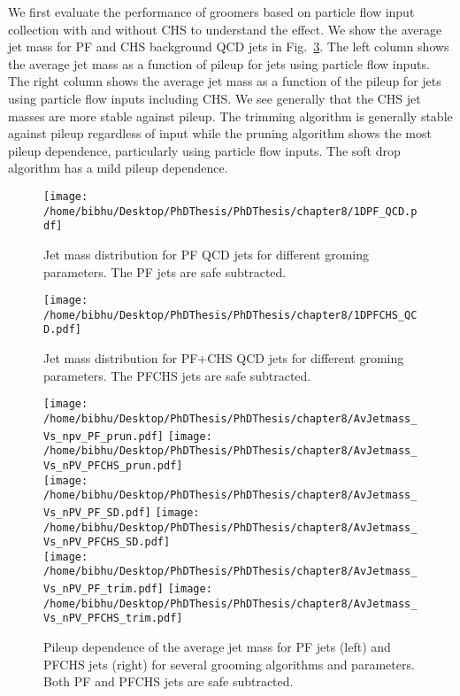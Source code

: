 We first evaluate the performance of groomers based on particle flow input collection with and without CHS to understand the effect.
We show the average jet mass for PF and CHS background QCD jets in Fig.~\ref{fig:grooming_PFvCHS}.
The left column shows the average jet mass as a function of pileup for jets using particle flow inputs.
The right column shows the average jet mass as a function of the pileup for jets using particle flow inputs including CHS.
We see generally that the CHS jet masses are more stable against pileup.  
The trimming algorithm is generally stable against pileup regardless of input while the pruning algorithm shows the most pileup dependence, particularly using particle flow inputs.
The soft drop algorithm has a mild pileup dependence.


\begin{figure}[h!]
\centering
\texttt{[image: /home/bibhu/Desktop/PhDThesis/PhDThesis/chapter8/1DPF\_QCD.pdf]}
\caption{Jet mass distribution for PF  QCD jets for different groming parameters. The PF jets are safe subtracted.}
\label{fig:jet_mass_pf_all_groomer}
\end{figure}


\begin{figure}[h!]
\centering
\texttt{[image: /home/bibhu/Desktop/PhDThesis/PhDThesis/chapter8/1DPFCHS\_QCD.pdf]}
\caption{Jet mass distribution for PF+CHS  QCD jets for different groming parameters. The PFCHS jets are safe subtracted.}
\label{fig:jet_mass_chs_all_groomer}
\end{figure}



\begin{figure}[h!]
\centering
\texttt{[image: /home/bibhu/Desktop/PhDThesis/PhDThesis/chapter8/AvJetmass\_Vs\_npv\_PF\_prun.pdf]}
\texttt{[image: /home/bibhu/Desktop/PhDThesis/PhDThesis/chapter8/AvJetmass\_Vs\_nPV\_PFCHS\_prun.pdf]}\\
\texttt{[image: /home/bibhu/Desktop/PhDThesis/PhDThesis/chapter8/AvJetmass\_Vs\_nPV\_PF\_SD.pdf]}
\texttt{[image: /home/bibhu/Desktop/PhDThesis/PhDThesis/chapter8/AvJetmass\_Vs\_nPV\_PFCHS\_SD.pdf]}\\
\texttt{[image: /home/bibhu/Desktop/PhDThesis/PhDThesis/chapter8/AvJetmass\_Vs\_nPV\_PF\_trim.pdf]}
\texttt{[image: /home/bibhu/Desktop/PhDThesis/PhDThesis/chapter8/AvJetmass\_Vs\_nPV\_PFCHS\_trim.pdf]}\\
\caption{Pileup dependence of the average jet mass for PF jets (left) and PFCHS jets (right) for several grooming algorithms and parameters. Both PF and PFCHS jets are safe subtracted.}
\label{fig:grooming_PFvCHS}
\end{figure}






